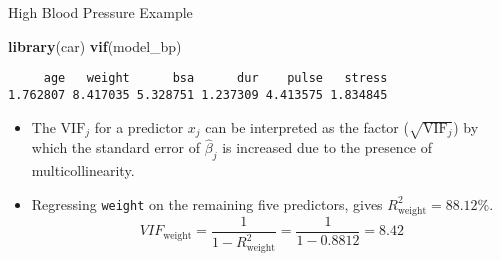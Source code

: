 \documentclass[
  ignorenonframetext,
]{beamer}
\newenvironment{Shaded}{\begin{snugshade}}{\end{snugshade}}
\newcommand{\FunctionTok}[1]{\textcolor[rgb]{0.13,0.29,0.53}{\textbf{#1}}}
\newcommand{\NormalTok}[1]{#1}
\begin{document}
\begin{frame}[fragile]{High Blood Pressure Example}
\protect\hypertarget{high-blood-pressure-example-3}{}
\normalsize

\begin{Shaded}
\begin{Highlighting}[]
\FunctionTok{library}\NormalTok{(car)}
\FunctionTok{vif}\NormalTok{(model\_bp)}
\end{Highlighting}
\end{Shaded}

\begin{verbatim}
     age   weight      bsa      dur    pulse   stress 
1.762807 8.417035 5.328751 1.237309 4.413575 1.834845 
\end{verbatim}

\normalsize

\begin{itemize}
\item
  The \(\text{VIF}_j\) for a predictor \(x_j\) can be interpreted as the
  factor (\(\sqrt{\text{VIF}_j}\)) by which the standard error of
  \(\hat{\beta}_j\) is increased due to the presence of
  multicollinearity.
\item
  Regressing \texttt{weight} on the remaining five predictors, gives
  \(R^2_{\text{weight}}=88.12\%\).
  \[VIF_{\text{weight}}=\frac{1}{1-R^2_{\text{weight}}}=\frac{1}{1-0.8812}=8.42\]
\end{itemize}
\end{frame}
\end{document}
